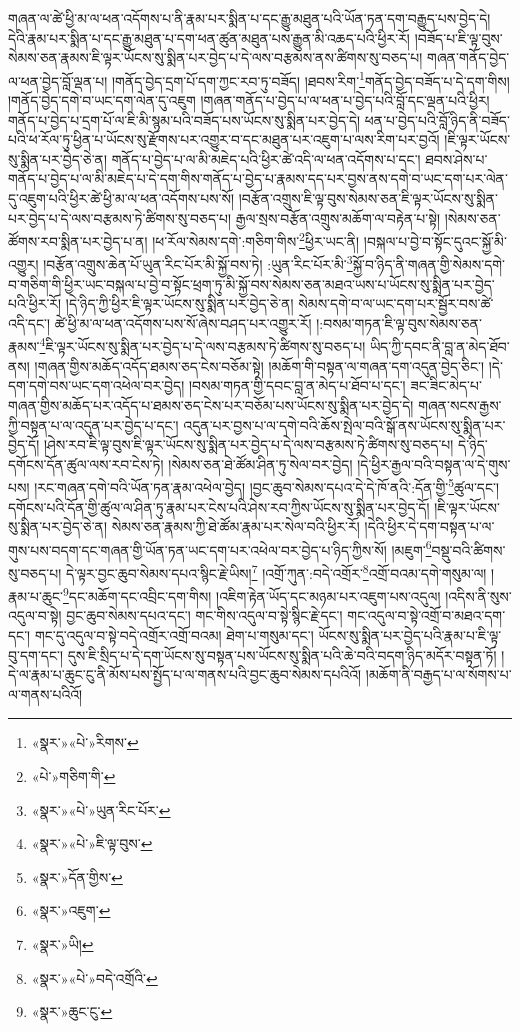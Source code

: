 གཞན་ལ་ཚེ་ཕྱི་མ་ལ་ཕན་འདོགས་པ་ནི་རྣམ་པར་སྨིན་པ་དང་རྒྱུ་མཐུན་པའི་ཡོན་ཏན་དག་བརྒྱུད་པས་བྱེད་དེ། དེའི་རྣམ་པར་སྨིན་པ་དང་རྒྱུ་མཐུན་པ་དག་ཕན་ཚུན་མཐུན་པས་རྒྱུན་མི་འཆད་པའི་ཕྱིར་རོ། །བཟོད་པ་ཇི་ལྟ་བུས་སེམས་ཅན་རྣམས་ཇི་ལྟར་ཡོངས་སུ་སྨིན་པར་བྱེད་པ་དེ་ལས་བརྩམས་ནས་ཚིགས་སུ་བཅད་པ། གཞན་གནོད་བྱེད་ལ་ཕན་བྱེད་བློ་ལྡན་པ། །གནོད་བྱེད་དྲག་པོ་དག་ཀྱང་རབ་ཏུ་བཟོད། །ཐབས་རིག་\footnote{«སྣར་»«པེ་»རིགས་}གནོད་བྱེད་བཟོད་པ་དེ་དག་གིས། །གནོད་བྱེད་དགེ་བ་ཡང་དག་ལེན་དུ་འཇུག །གཞན་གནོད་པ་བྱེད་པ་ལ་ཕན་པ་བྱེད་པའི་བློ་དང་ལྡན་པའི་ཕྱིར། གནོད་པ་བྱེད་པ་དྲག་པོ་ལ་ཇི་མི་སྙམ་པའི་བཟོད་པས་ཡོངས་སུ་སྨིན་པར་བྱེད་དེ། ཕན་པ་བྱེད་པའི་བློ་ཉིད་ནི་བཟོད་པའི་ཕ་རོལ་ཏུ་ཕྱིན་པ་ཡོངས་སུ་རྫོགས་པར་འགྱུར་བ་དང་མཐུན་པར་འཇུག་པ་ལས་རིག་པར་བྱའོ། །ཇི་ལྟར་ཡོངས་སུ་སྨིན་པར་བྱེད་ཅེ་ན། གནོད་པ་བྱེད་པ་ལ་མི་མཇེད་པའི་ཕྱིར་ཚེ་འདི་ལ་ཕན་འདོགས་པ་དང་། ཐབས་ཤེས་པ་གནོད་པ་བྱེད་པ་ལ་མི་མཇེད་པ་དེ་དག་གིས་གནོད་པ་བྱེད་པ་རྣམས་དད་པར་བྱས་ནས་དགེ་བ་ཡང་དག་པར་ལེན་དུ་འཇུག་པའི་ཕྱིར་ཚེ་ཕྱི་མ་ལ་ཕན་འདོགས་པས་སོ། །བརྩོན་འགྲུས་ཇི་ལྟ་བུས་སེམས་ཅན་ཇི་ལྟར་ཡོངས་སུ་སྨིན་པར་བྱེད་པ་དེ་ལས་བརྩམས་ཏེ་ཚིགས་སུ་བཅད་པ། རྒྱལ་སྲས་བརྩོན་འགྲུས་མཆོག་ལ་བརྟེན་པ་སྟེ། །སེམས་ཅན་ཚོགས་རབ་སྨིན་པར་བྱེད་པ་ན། །ཕ་རོལ་སེམས་དགེ་:གཅིག་གིས་\footnote{«པེ་»གཅིག་གི་}ཕྱིར་ཡང་ནི། །བསྐལ་པ་བྱེ་བ་སྟོང་དུའང་སྐྱོ་མི་འགྱུར། །བརྩོན་འགྲུས་ཆེན་པོ་ཡུན་རིང་པོར་མི་སྐྱོ་བས་ཏེ། :ཡུན་རིང་པོར་མི་\footnote{«སྣར་»«པེ་»ཡུན་རིང་པོར་}སྐྱོ་བ་ཉིད་ནི་གཞན་གྱི་སེམས་དགེ་བ་གཅིག་གི་ཕྱིར་ཡང་བསྐལ་པ་བྱེ་བ་སྟོང་ཕྲག་ཏུ་མི་སྐྱོ་བས་སེམས་ཅན་མཐའ་ཡས་པ་ཡོངས་སུ་སྨིན་པར་བྱེད་པའི་ཕྱིར་རོ། །དེ་ཉིད་ཀྱི་ཕྱིར་ཇི་ལྟར་ཡོངས་སུ་སྨིན་པར་བྱེད་ཅེ་ན། སེམས་དགེ་བ་ལ་ཡང་དག་པར་སྦྱོར་བས་ཚེ་འདི་དང་། ཚེ་ཕྱི་མ་ལ་ཕན་འདོགས་པས་སོ་ཞེས་བཤད་པར་འགྱུར་རོ། །:བསམ་གཏན་ཇི་ལྟ་བུས་སེམས་ཅན་རྣམས་\footnote{«སྣར་»«པེ་»ཇི་ལྟ་བུས་}ཇི་ལྟར་ཡོངས་སུ་སྨིན་པར་བྱེད་པ་དེ་ལས་བརྩམས་ཏེ་ཚིགས་སུ་བཅད་པ། ཡིད་ཀྱི་དབང་ནི་བླ་ན་མེད་ཐོབ་ནས། །གཞན་གྱིས་མཆོད་འདོད་ཐམས་ཅད་ངེས་བཅོམ་སྟེ། །མཆོག་གི་བསྟན་ལ་གཞན་དག་འདུན་བྱེད་ཅིང་། །དེ་དག་དགེ་བས་ཡང་དག་འཕེལ་བར་བྱེད། །བསམ་གཏན་གྱི་དབང་བླ་ན་མེད་པ་ཐོབ་པ་དང་། ཟང་ཟིང་མེད་པ་གཞན་གྱིས་མཆོད་པར་འདོད་པ་ཐམས་ཅད་ངེས་པར་བཅོམ་པས་ཡོངས་སུ་སྨིན་པར་བྱེད་དེ། གཞན་སངས་རྒྱས་ཀྱི་བསྟན་པ་ལ་འདུན་པར་བྱེད་པ་དང་། འདུན་པར་བྱས་པ་ལ་དགེ་བའི་ཆོས་སྤེལ་བའི་སྒོ་ནས་ཡོངས་སུ་སྨིན་པར་བྱེད་དོ། །ཤེས་རབ་ཇི་ལྟ་བུས་ཇི་ལྟར་ཡོངས་སུ་སྨིན་པར་བྱེད་པ་དེ་ལས་བརྩམས་ཏེ་ཚིགས་སུ་བཅད་པ། དེ་ཉིད་དགོངས་དོན་ཚུལ་ལས་རབ་ངེས་ཏེ། །སེམས་ཅན་ཐེ་ཚོམ་ཤིན་ཏུ་སེལ་བར་བྱེད། །དེ་ཕྱིར་རྒྱལ་བའི་བསྟན་ལ་དེ་གུས་པས། །རང་གཞན་དགེ་བའི་ཡོན་ཏན་རྣམ་འཕེལ་བྱེད། །བྱང་ཆུབ་སེམས་དཔའ་དེ་དེ་ཁོ་ནའི་:དོན་གྱི་\footnote{«སྣར་»དོན་གྱིས་}ཚུལ་དང་། དགོངས་པའི་དོན་གྱི་ཚུལ་ལ་ཤིན་ཏུ་རྣམ་པར་ངེས་པའི་ཤེས་རབ་ཀྱིས་ཡོངས་སུ་སྨིན་པར་བྱེད་དོ། །ཇི་ལྟར་ཡོངས་སུ་སྨིན་པར་བྱེད་ཅེ་ན། སེམས་ཅན་རྣམས་ཀྱི་ཐེ་ཚོམ་རྣམ་པར་སེལ་བའི་ཕྱིར་རོ། །དེའི་ཕྱིར་དེ་དག་བསྟན་པ་ལ་གུས་པས་བདག་དང་གཞན་གྱི་ཡོན་ཏན་ཡང་དག་པར་འཕེལ་བར་བྱེད་པ་ཉིད་ཀྱིས་སོ། །མཇུག་\footnote{«སྣར་»འཇུག་}བསྡུ་བའི་ཚིགས་སུ་བཅད་པ། དེ་ལྟར་བྱང་ཆུབ་སེམས་དཔའ་སྙིང་རྗེ་ཡིས།\footnote{«སྣར་»ཡི།} །འགྲོ་ཀུན་:བདེ་འགྲོར་\footnote{«སྣར་»«པེ་»བདེ་འགྲོའི་}འགྲོ་བའམ་དགེ་གསུམ་ལ། །རྣམ་པ་ཆུང་\footnote{«སྣར་»ཆུང་ངུ་}དང་མཆོག་དང་འབྲིང་དག་གིས། །འཇིག་རྟེན་ཡོད་དང་མཉམ་པར་འཇུག་པས་འདུལ། །འདིས་ནི་སུས་འདུལ་བ་སྟེ། བྱང་ཆུབ་སེམས་དཔའ་དང་། གང་གིས་འདུལ་བ་སྟེ་སྙིང་རྗེ་དང་། གང་འདུལ་བ་སྟེ་འགྲོ་བ་མཐའ་དག་དང་། གང་དུ་འདུལ་བ་སྟེ་བདེ་འགྲོར་འགྲོ་བའམ། ཐེག་པ་གསུམ་དང་། ཡོངས་སུ་སྨིན་པར་བྱེད་པའི་རྣམ་པ་ཇི་ལྟ་བུ་དག་དང་། དུས་ཇི་སྲིད་པ་དེ་དག་ཡོངས་སུ་བསྟན་པས་ཡོངས་སུ་སྨིན་པའི་ཆེ་བའི་བདག་ཉིད་མདོར་བསྟན་ཏོ། །དེ་ལ་རྣམ་པ་ཆུང་ངུ་ནི་མོས་པས་སྤྱོད་པ་ལ་གནས་པའི་བྱང་ཆུབ་སེམས་དཔའིའོ། །མཆོག་ནི་བརྒྱད་པ་ལ་སོགས་པ་ལ་གནས་པའིའོ། 